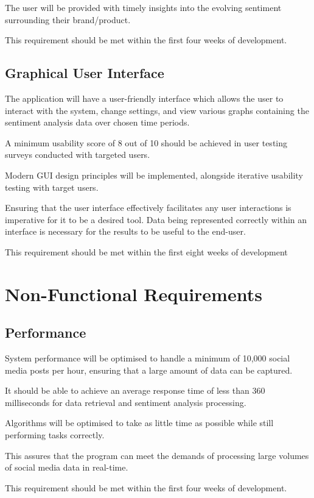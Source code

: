     The user will be provided with timely insights into the evolving sentiment surrounding their brand/product.

    This requirement should be met within the first four weeks of development.

    \subsection{Graphical User Interface}
    The application will have a user-friendly interface which allows the user to interact with the system, change settings, and view various graphs containing the sentiment analysis data over chosen time periods.

    A minimum usability score of 8 out of 10 should be achieved in user testing surveys conducted with targeted users.

    Modern GUI design principles will be implemented, alongside iterative usability testing with target users.

    Ensuring that the user interface effectively facilitates any user interactions is imperative for it to be a desired tool. Data being represented correctly within an interface is necessary for the results to be useful to the end-user.

    This requirement should be met within the first eight weeks of development

\section{Non-Functional Requirements}

    \subsection{Performance}
    System performance will be optimised to handle a minimum of 10,000 social media posts per hour, ensuring that a large amount of data can be captured.

    It should be able to achieve an average response time of less than 360 milliseconds for data retrieval and sentiment analysis processing.

    Algorithms will be optimised to take as little time as possible while still performing tasks correctly.

    This assures that the program can meet the demands of processing large volumes of social media data in real-time.

    This requirement should be met within the first four weeks of development.

